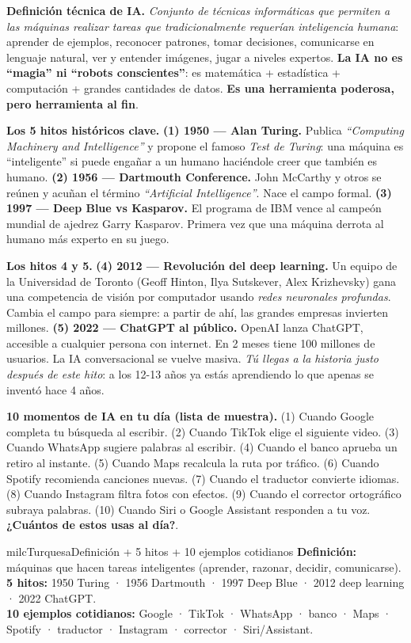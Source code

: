\documentclass[11pt,letterpaper]{article}
\newcommand{\milcpaso}[3]{%
\Needspace{4\baselineskip}%
\begin{tcolorbox}[enhanced,colback=white,colframe=milcLinea,arc=1.5mm,boxrule=.9pt,
  left=14mm,right=4mm,top=3mm,bottom=3mm,before skip=4pt,after skip=4pt,
  fontupper=\RaggedRight,
  overlay={\node[anchor=north west,circle,fill=#2,text=white,inner sep=0pt,
    minimum size=7.4mm,font=\sffamily\bfseries\small]
    at ([xshift=3.6mm,yshift=-3.2mm]frame.north west) {#1};}]
#3
\end{tcolorbox}}
\begin{document}
\milcpaso{1}{milcTurquesa}{\textbf{Definición técnica de IA.} \emph{Conjunto de técnicas informáticas que permiten a las máquinas realizar tareas que tradicionalmente requerían inteligencia humana}: aprender de ejemplos, reconocer patrones, tomar decisiones, comunicarse en lenguaje natural, ver y entender imágenes, jugar a niveles expertos. \textbf{La IA no es ``magia'' ni ``robots conscientes''}: es matemática + estadística + computación + grandes cantidades de datos. \textbf{Es una herramienta poderosa, pero herramienta al fin}.}
\milcpaso{2}{milcTurquesa}{\textbf{Los 5 hitos históricos clave.} \textbf{(1) 1950 --- Alan Turing.} Publica \emph{``Computing Machinery and Intelligence''} y propone el famoso \emph{Test de Turing}: una máquina es ``inteligente'' si puede engañar a un humano haciéndole creer que también es humano. \textbf{(2) 1956 --- Dartmouth Conference.} John McCarthy y otros se reúnen y acuñan el término \emph{``Artificial Intelligence''}. Nace el campo formal. \textbf{(3) 1997 --- Deep Blue vs Kasparov.} El programa de IBM vence al campeón mundial de ajedrez Garry Kasparov. Primera vez que una máquina derrota al humano más experto en su juego.}
\milcpaso{3}{milcTurquesa}{\textbf{Los hitos 4 y 5.} \textbf{(4) 2012 --- Revolución del deep learning.} Un equipo de la Universidad de Toronto (Geoff Hinton, Ilya Sutskever, Alex Krizhevsky) gana una competencia de visión por computador usando \emph{redes neuronales profundas}. Cambia el campo para siempre: a partir de ahí, las grandes empresas invierten millones. \textbf{(5) 2022 --- ChatGPT al público.} OpenAI lanza ChatGPT, accesible a cualquier persona con internet. En 2 meses tiene 100 millones de usuarios. La IA conversacional se vuelve masiva. \emph{Tú llegas a la historia justo después de este hito}: a los 12-13 años ya estás aprendiendo lo que apenas se inventó hace 4 años.}
\milcpaso{4}{milcTurquesa}{\textbf{10 momentos de IA en tu día (lista de muestra).} (1) Cuando Google completa tu búsqueda al escribir. (2) Cuando TikTok elige el siguiente video. (3) Cuando WhatsApp sugiere palabras al escribir. (4) Cuando el banco aprueba un retiro al instante. (5) Cuando Maps recalcula la ruta por tráfico. (6) Cuando Spotify recomienda canciones nuevas. (7) Cuando el traductor convierte idiomas. (8) Cuando Instagram filtra fotos con efectos. (9) Cuando el corrector ortográfico subraya palabras. (10) Cuando Siri o Google Assistant responden a tu voz. \textbf{¿Cuántos de estos usas al día?}.}

\begin{drawbox}{milcTurquesa}{Definición + 5 hitos + 10 ejemplos cotidianos}
\textbf{Definición:} máquinas que hacen tareas inteligentes (aprender, razonar, decidir, comunicarse). \\[1mm]
\textbf{5 hitos:} 1950 Turing · 1956 Dartmouth · 1997 Deep Blue · 2012 deep learning · 2022 ChatGPT. \\[1mm]
\textbf{10 ejemplos cotidianos:} Google · TikTok · WhatsApp · banco · Maps · Spotify · traductor · Instagram · corrector · Siri/Assistant.
\end{drawbox}
\end{document}
